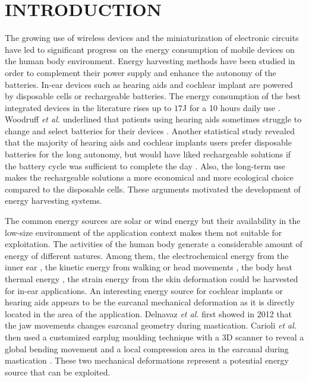 \documentclass[3p,twocolumn,preprint]{elsarticle}
\begin{document}
\section{INTRODUCTION}
\label{INTRODUCTION}
The growing use of wireless devices and the miniaturization of electronic circuits have led to significant progress on the energy consumption of mobile devices on the human body environment. Energy harvesting methods have been studied in order to complement their power supply and enhance the autonomy of the batteries. In-ear devices such as hearing aids and cochlear implant are powered by disposable cells or rechargeable batteries. The energy consumption of the best integrated devices in the literature rises up to $17$J for a 10 hours daily use \cite{Scherer2019,Yip2015,Kulah2022}. Woodruff \emph{et al.} underlined that patients using hearing aids sometimes struggle to change and select batteries for their devices \cite{Woodruff2021}. Another statistical study revealed that the majority of hearing aids and cochlear implants users prefer disposable batteries for the long autonomy, but would have liked rechargeable solutions if the battery cycle was sufficient to complete the day \cite{PracticesAudiology2016}. Also, the long-term use makes the rechargeable solutions a more economical and more ecological choice compared to the disposable cells. These arguments motivated the development of energy harvesting systems.

The common energy sources are solar or wind energy but their availability in the low-size environment of the application context makes them not suitable for exploitation. The activities of the human body generate a considerable amount of energy of different natures. Among them, the electrochemical energy from the inner ear \cite{Mercier2012}, the kinetic energy from walking or head movements \cite{Azimi2021,Smilek2016}, the body heat thermal energy \cite{Kim2014}, the strain energy from the skin deformation \cite{Jin2021} could be harvested for in-ear applications. An interesting energy source for cochlear implants or hearing aids appears to be the earcanal mechanical deformation as it is directly located in the area of the application. Delnavaz \emph{et al.} first showed in 2012 that the jaw movements changes earcanal geometry during mastication. Carioli \emph{et al.} then used a customized earplug moulding technique with a 3D scanner to reveal a global bending movement and a local compression area in the earcanal during mastication \cite{Carioli2016}. These two mechanical deformations represent a potential energy source that can be exploited.
\end{document}
